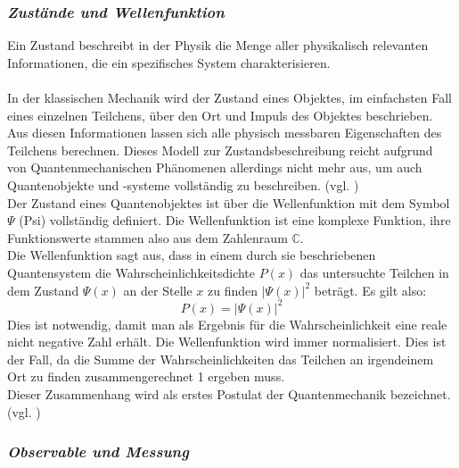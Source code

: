 \subsubsection*{\textit{Zustände und Wellenfunktion}}
\label{Zustände und Wellenfunktion}

Ein Zustand beschreibt in der Physik die Menge aller physikalisch relevanten Informationen, die ein spezifisches System charakterisieren.\\
\\
In der klassischen Mechanik wird der Zustand eines Objektes, im einfachsten Fall eines einzelnen Teilchens, über den Ort und Impuls des Objektes beschrieben. Aus diesen Informationen lassen sich alle physisch messbaren Eigenschaften des Teilchens berechnen. Dieses Modell zur Zustandsbeschreibung reicht aufgrund von Quantenmechanischen Phänomenen allerdings nicht mehr aus, um auch Quantenobjekte und -systeme vollständig zu beschreiben. (vgl. \cite[Ch. 3.1]{osada_introduction_2022})\\

Der Zustand eines Quantenobjektes ist über die Wellenfunktion mit dem Symbol $\Psi$ (Psi) vollständig definiert. Die Wellenfunktion ist eine komplexe Funktion, ihre Funktionswerte stammen also aus dem Zahlenraum $\mathbb{C}$.\\
Die Wellenfunktion sagt aus, dass in einem durch sie beschriebenen Quantensystem die Wahrscheinlichkeitsdichte $P(x)$ das untersuchte Teilchen in dem Zustand $\Psi(x)$ an der Stelle $x$ zu finden $|\Psi(x)|^2$ beträgt. Es gilt also:\\
\begin{equation*}
P(x) = |\Psi(x)|^2
\end{equation*}
Dies ist notwendig, damit man als Ergebnis für die Wahrscheinlichkeit eine reale nicht negative Zahl erhält. Die Wellenfunktion wird immer normalisiert. Dies ist der Fall, da die Summe der Wahrscheinlichkeiten das Teilchen an irgendeinem Ort zu finden zusammengerechnet 1 ergeben muss.\\
Dieser Zusammenhang wird als erstes Postulat der Quantenmechanik bezeichnet. (vgl. \cite[Ch. 1.6]{kasirajan_fundamentals_2021})

\subsubsection*{\textit{Observable und Messung}}
\label{Observable und Messung}

